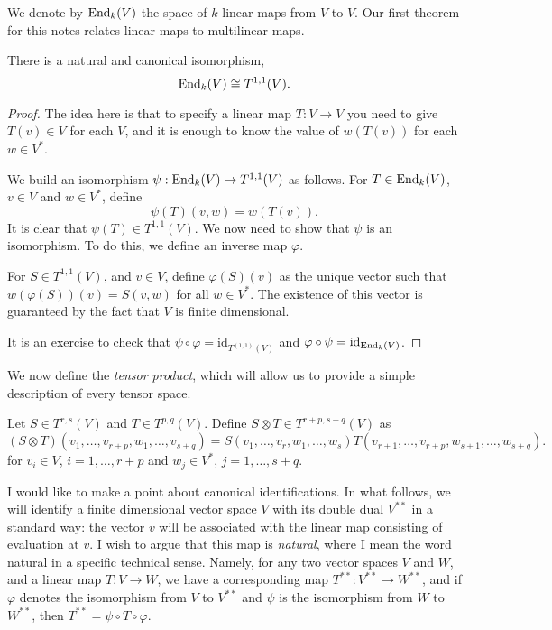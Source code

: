 \documentclass{owmaths}
\begin{document}
We denote by $\operatorname{End}_k(V)$ the space of $k$-linear maps from $V$ to $V$. Our
first theorem for this notes relates linear maps to multilinear maps.
\begin{proposition}
    There is a natural and canonical isomorphism,
    \begin{equation*}
        \operatorname{End}_k(V) \cong T^{1,1}(V).
    \end{equation*}
\end{proposition}
\begin{proof}
    The idea here is that to specify a linear map $T:V\rightarrow V$
    you need to give $T(v) \in V$ for each $V$, and it is enough
    to know the value of $w(T(v))$ for each $w \in V^*$.

    We build an isomorphism $\psi:\operatorname{End}_k(V)\rightarrow T^{1,1}(V)$ as follows. 
    For $T \in \operatorname{End}_k(V)$, $v \in V$ and $w \in V^*$, define
    \begin{equation*}
        \psi(T)(v,w) = w(T(v)).
    \end{equation*}
    It is clear that $\psi(T) \in T^{1,1}(V)$. We now need to show that $\psi$ is
    an isomorphism. To do this, we define an inverse map $\varphi$. 
    
    For $S \in T^{1,1}(V)$, and $v \in V$, define $\varphi(S)(v)$
    as the unique vector such that $w(\varphi(S))(v) = S(v,w)$ for
    all $w \in V^*$. The existence of this vector is guaranteed by 
    the fact that $V$ is finite dimensional.
    
    It is an exercise to check that $\psi\circ \varphi = \mathrm{id}_{T^{(1,1)}(V)}$
    and $\varphi \circ \psi = \mathrm{id}_{\operatorname{End}_k(V)}$.
\end{proof}

We now define the \emph{tensor product}, which will allow
us to provide a simple description of every tensor space. 
\begin{definition}
    Let $S \in T^{r,s}(V)$ and $T \in T^{p,q}(V)$. Define $S \otimes T \in T^{r+p,s+q}(V)$
    as
    \begin{equation*}
        (S\otimes T)(v_1,\ldots,v_{r+p},w_1,\ldots,v_{s+q}) = S(v_1,\ldots,v_r,w_1,\ldots,w_s)T(v_{r+1},\ldots,v_{r+p},w_{s+1},\ldots,w_{s+q}).
    \end{equation*}
    for $v_i \in V$, $i = 1,\ldots,r+p$ and $w_j\in V^*$, $j = 1,\ldots,s+q$.
\end{definition}

I would like to make a point about canonical identifications. In what follows,
we will identify a finite dimensional vector space $V$ with its double dual $V^{**}$
in a standard way: the vector $v$ will be associated with the linear map consisting
of evaluation at $v$. I wish to argue that this map is \emph{natural}, where I mean 
the word natural in a specific technical sense. Namely, for any two vector
spaces $V$ and $W$, and a linear map $T:V\rightarrow W$, we have a corresponding
map $T^{**}:V^{**}\rightarrow W^{**}$, and if $\varphi$ denotes the isomorphism from
$V$ to $V^{**}$ and $\psi$ is the isomorphism from $W$ to $W^{**}$, then $T^{**} = \psi \circ T \circ \varphi$.
\end{document}

